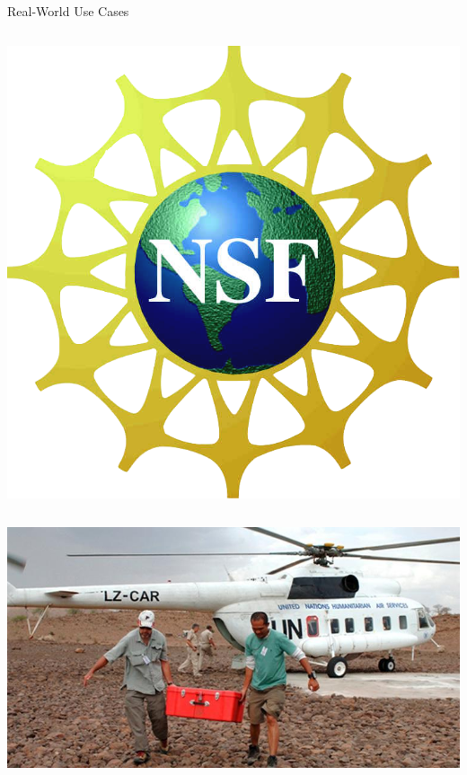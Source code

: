 \documentclass[compress]{beamer}
\begin{document}
\begin{frame}{Real-World Use Cases}
\begin{columns}
  \includegraphics[width=\linewidth]{general_figures/nsf}
\end{columns}

\begin{center}
  \includegraphics[width=.4\linewidth]{interactive_topic_models/disaster}
\end{center}

\end{frame}

\begin{frame}[plain]
\vspace*{-1pt}
\end{frame}
\end{document}
